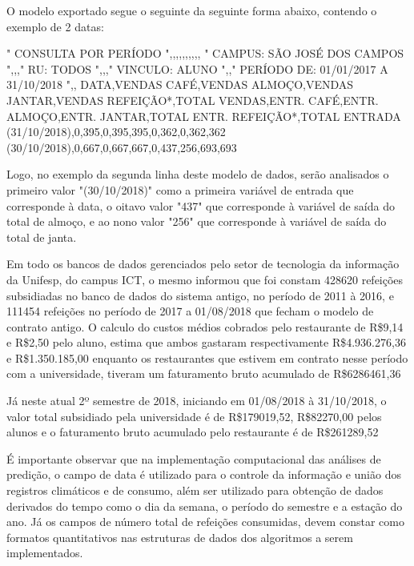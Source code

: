 \documentclass[	12pt, Times, openright, twoside, a4paper, english, brazil]{abntex2}
\begin{document}
	O modelo exportado segue o seguinte da seguinte forma abaixo, contendo o exemplo de 2 datas: \\
	\begin{algorithm}[H]
		"
		CONSULTA POR PERÍODO                    ",,,,,,,,,,
		"
		CAMPUS: SÃO JOSÉ DOS CAMPOS                    ",,,"
		RU: TODOS                    ",,,"
		VINCULO: ALUNO                    ",,"
		PERÍODO DE: 01/01/2017 A 31/10/2018                        ",,
		DATA,VENDAS CAFÉ,VENDAS ALMOÇO,VENDAS JANTAR,VENDAS REFEIÇÃO*,TOTAL VENDAS,ENTR. CAFÉ,ENTR. ALMOÇO,ENTR. JANTAR,TOTAL ENTR. REFEIÇÃO*,TOTAL ENTRADA
		(31/10/2018),0,395,0,395,395,0,362,0,362,362
		(30/10/2018),0,667,0,667,667,0,437,256,693,693
	\end{algorithm}
	
	Logo, no exemplo da segunda linha deste modelo de dados, serão analisados o primeiro valor "(30/10/2018)" como a primeira variável de entrada que corresponde à data, o oitavo valor "437" que corresponde à variável de saída do total de almoço, e ao nono valor "256" que corresponde à variável de saída do total de janta.
	
	Em todo os bancos de dados gerenciados pelo setor de tecnologia da informação da Unifesp, do campus ICT, o mesmo informou que foi constam 428620 refeições subsidiadas no banco de dados do sistema antigo, no período de 2011 à 2016, e 111454 refeições no período de 2017 a 01/08/2018 que fecham o modelo de contrato antigo. O calculo do custos médios cobrados pelo restaurante de R\$9,14 e R\$2,50 pelo aluno, estima que ambos gastaram respectivamente R\$4.936.276,36 e R\$1.350.185,00 enquanto os restaurantes que estivem em contrato nesse período com a universidade, tiveram um faturamento bruto acumulado de R\$6286461,36
	
	Já neste atual 2º semestre de 2018, iniciando em 01/08/2018 à 31/10/2018, o valor total subsidiado pela universidade é de R\$179019,52, R\$82270,00 pelos alunos e o faturamento bruto acumulado pelo restaurante é de R\$261289,52
	
	É importante observar que na implementação computacional das análises de predição, o campo de data é utilizado para o controle da informação e união dos registros climáticos e de consumo, além ser utilizado para obtenção de dados derivados do tempo como o dia da semana, o período do semestre e a estação do ano. Já os campos de número total de refeições consumidas, devem constar como formatos quantitativos nas estruturas de dados dos algoritmos a serem implementados.
	
\end{document}
